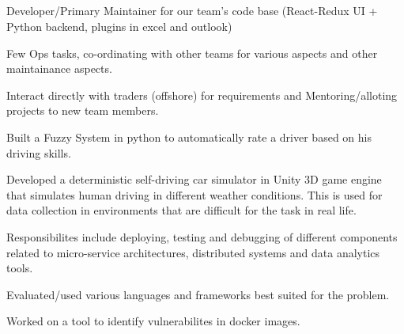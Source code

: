 \documentclass[letterpaper]{deedy-resume} %
\begin{document}
\begin{minipage}[t]{0.66\textwidth} %

\subsection{}

\vspace{\topsep} %
\begin{tightitemize}
\item Developer/Primary Maintainer for our team's code base (React-Redux UI + Python backend, plugins in excel and outlook)
\item Few Ops tasks, co-ordinating with other teams for various aspects and other maintainance aspects.
\item Interact directly with traders (offshore) for requirements and Mentoring/alloting projects to new team members.
\end{tightitemize}

\sectionspace %



\begin{tightitemize}
\item Built a Fuzzy System in python to automatically rate a driver based on his driving skills.
\item Developed a deterministic self-driving car simulator in Unity 3D game engine that simulates human driving in different weather conditions. This is used for data collection in environments that are difficult for the task in real life.
\end{tightitemize}

\sectionspace %



\begin{tightitemize}
\item Responsibilites include deploying, testing and debugging of different components related to micro-service architectures, distributed systems and data analytics tools.
\item Evaluated/used various languages and frameworks best suited for the problem.
\item Worked on a tool to identify vulnerabilites in docker images.
\end{tightitemize}


\end{minipage}
\end{document}

